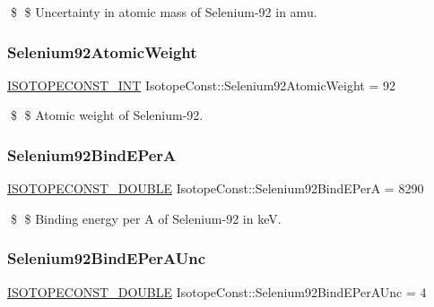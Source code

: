 \$ \$ Uncertainty in atomic mass of Selenium-\/92 in amu. \mbox{\label{group___isotope_const-_selenium-_se92_ga681d36e4a26568caa0923346c6eacfeb}} 
\subsubsection{\texorpdfstring{Selenium92\+Atomic\+Weight}{Selenium92AtomicWeight}}
{\footnotesize\ttfamily \mbox{\hyperlink{group___isotope_const-_macros_ga5f18360b3e99483a35c32d789e62621c}{I\+S\+O\+T\+O\+P\+E\+C\+O\+N\+S\+T\+\_\+\+I\+NT}} Isotope\+Const\+::\+Selenium92\+Atomic\+Weight = 92}

\$ \$ Atomic weight of Selenium-\/92. \mbox{\label{group___isotope_const-_selenium-_se92_ga1db6e0015f0a33933fc57b9bff1d038b}} 
\subsubsection{\texorpdfstring{Selenium92\+Bind\+E\+PerA}{Selenium92BindEPerA}}
{\footnotesize\ttfamily \mbox{\hyperlink{group___isotope_const-_macros_ga8f45a7272ce02c0b4c65c44636ed719a}{I\+S\+O\+T\+O\+P\+E\+C\+O\+N\+S\+T\+\_\+\+D\+O\+U\+B\+LE}} Isotope\+Const\+::\+Selenium92\+Bind\+E\+PerA = 8290}

\$ \$ Binding energy per A of Selenium-\/92 in keV. \mbox{\label{group___isotope_const-_selenium-_se92_ga22f8d42e68c7758f95e5e36c1ae9ded3}} 
\subsubsection{\texorpdfstring{Selenium92\+Bind\+E\+Per\+A\+Unc}{Selenium92BindEPerAUnc}}
{\footnotesize\ttfamily \mbox{\hyperlink{group___isotope_const-_macros_ga8f45a7272ce02c0b4c65c44636ed719a}{I\+S\+O\+T\+O\+P\+E\+C\+O\+N\+S\+T\+\_\+\+D\+O\+U\+B\+LE}} Isotope\+Const\+::\+Selenium92\+Bind\+E\+Per\+A\+Unc = 4}

